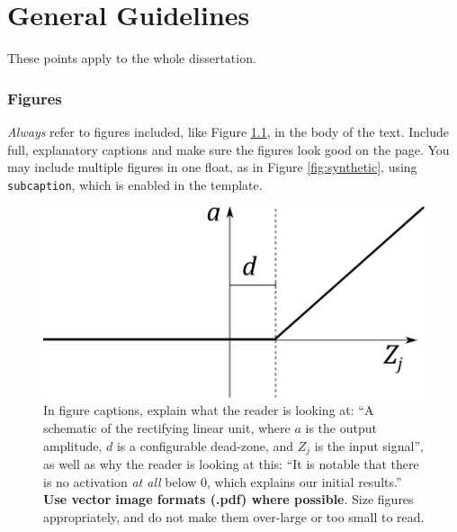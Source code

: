 \documentclass{l4proj}
\begin{document}
\chapter{General Guidelines}

These points apply to the whole dissertation.

\subsection{Figures}
\emph{Always} refer to figures included, like Figure \ref{fig:relu}, in the body of the text. Include full, explanatory captions and make sure the figures look good on the page.
You may include multiple figures in one float, as in Figure \ref{fig:synthetic}, using \texttt{subcaption}, which is enabled in the template.



\begin{figure}
    \centering
    \includegraphics[width=0.5\linewidth]{images/relu.pdf}    

    \caption{In figure captions, explain what the reader is looking at: ``A schematic of the rectifying linear unit, where $a$ is the output amplitude,
    $d$ is a configurable dead-zone, and $Z_j$ is the input signal'', as well as why the reader is looking at this: 
    ``It is notable that there is no activation \emph{at all} below 0, which explains our initial results.'' 
    \textbf{Use vector image formats (.pdf) where possible}. Size figures appropriately, and do not make them over-large or too small to read.
    }

    \label{fig:relu} 
\end{figure}
\end{document}

